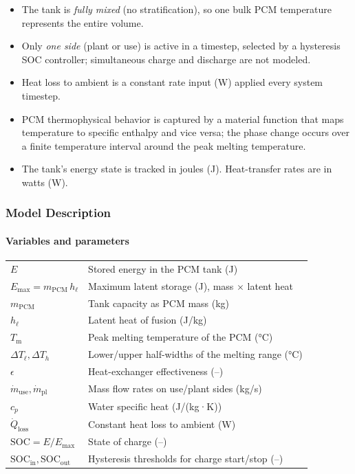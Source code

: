 \begin{itemize}
  \item The tank is \emph{fully mixed} (no stratification), so one bulk PCM temperature represents the entire volume.
  \item Only \emph{one side} (plant or use) is active in a timestep, selected by a hysteresis SOC controller; simultaneous charge and discharge are not modeled.
  \item Heat loss to ambient is a constant rate input (W) applied every system timestep.
  \item PCM thermophysical behavior is captured by a material function that maps temperature to specific enthalpy and vice versa; the phase change occurs over a finite temperature interval around the peak melting temperature.
  \item The tank’s energy state is tracked in joules (J). Heat-transfer rates are in watts (W).
\end{itemize}

\subsubsection{Model Description}\label{pcm-model-description}

\paragraph{Variables and parameters}\label{pcm-variables}

\begin{tabular}{ll}
$E$ & Stored energy in the PCM tank (J) \\
$E_{\max} = m_{\mathrm{PCM}} \, h_{\ell}$ & Maximum latent storage (J), mass $\times$ latent heat \\
$m_{\mathrm{PCM}}$ & Tank capacity as PCM mass (kg) \\
$h_{\ell}$ & Latent heat of fusion (J/kg) \\
$T_\mathrm{m}$ & Peak melting temperature of the PCM (°C) \\
$\Delta T_{\ell}, \Delta T_{h}$ & Lower/upper half-widths of the melting range (°C) \\
$\epsilon$ & Heat-exchanger effectiveness (–) \\
$\dot m_\mathrm{use}, \dot m_\mathrm{pl}$ & Mass flow rates on use/plant sides (kg/s) \\
$c_p$ & Water specific heat (J/(kg·K)) \\
$\dot Q_\mathrm{loss}$ & Constant heat loss to ambient (W) \\
$\mathrm{SOC} = E/E_{\max}$ & State of charge (–) \\
$\mathrm{SOC}_{\mathrm{in}}, \mathrm{SOC}_{\mathrm{out}}$ & Hysteresis thresholds for charge start/stop (–)
\end{tabular}


